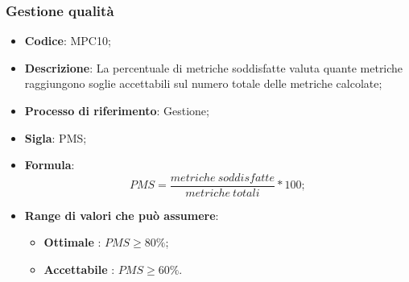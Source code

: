 \subsubsection{Gestione qualità}
\vspace{-1cm}
\begin{itemize}
	\item \textbf{Codice}: MPC10;
	\item \textbf{Descrizione}: La percentuale di metriche soddisfatte valuta quante metriche raggiungono soglie accettabili sul numero totale delle metriche calcolate;
	\item \textbf{Processo di riferimento}: Gestione;
	\item \textbf{Sigla}: PMS;
	\item \textbf{Formula}: \[ PMS = \frac{metriche \ soddisfatte}{metriche \ totali} \ast 100;\]
	\item \textbf{Range di valori che può assumere}: 
		\begin{itemize}
			\item \textbf{Ottimale} : $PMS \geq 80 \%$;
			\item \textbf{Accettabile} : $PMS \geq 60 \%$.
		\end{itemize}
\end{itemize}